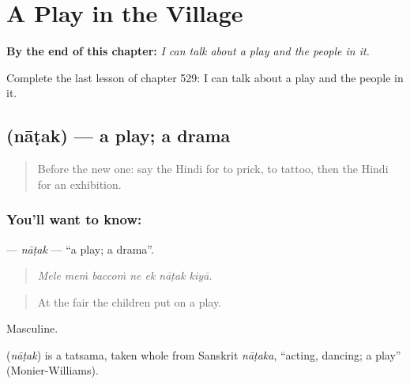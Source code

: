 
\chapter{A Play in the Village}
\label{ch:hi-a-play-in-the-village}

\begin{chapteropening}
\textbf{By the end of this chapter:} \emph{I can talk about a play and the people in it.}

Complete the last lesson of chapter 529: I can talk about a play and the people in it.
\end{chapteropening}

\section[\texorpdfstring{\hi{नाटक} (nāṭak)}{नाटक (nāṭak)}]{ (nāṭak) — a play; a drama}

\label{lesson:HI-C529-natak}



\begin{quote}
Before the new one: say the Hindi for to prick, to tattoo, then the Hindi for an exhibition.
\end{quote}

\subsection*{You'll want to know: }
\textbf{} — \emph{nāṭak} — \textquotedblleft{}a play; a drama\textquotedblright{}.

\begin{quote}
      
\end{quote}

\begin{quote}
\emph{Mele meṁ baccoṁ ne ek nāṭak kiyā.}
\end{quote}

\begin{quote}
At the fair the children put on a play.
\end{quote}

Masculine.

\begin{cousinweb}
\textbf{} (\emph{nāṭak}) is a tatsama, taken whole from Sanskrit \emph{nāṭaka}, \textquotedblleft{}acting, dancing; a play\textquotedblright{} (Monier-Williams).
\end{cousinweb}


